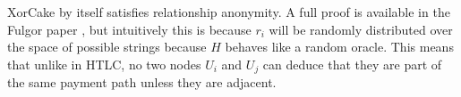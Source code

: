 \documentclass[USenglish,oneside,twocolumn]{article}
\begin{document}

XorCake by itself satisfies relationship anonymity. A full proof is available in the Fulgor paper \cite{malavolta2019anonymous}, but intuitively this is because $r_i$ will be randomly distributed over the space of possible strings because $H$ behaves like a random oracle. This means that unlike in HTLC, no two nodes $U_i$ and $U_j$ can deduce that they are part of the same payment path unless they are adjacent.
\end{document}
